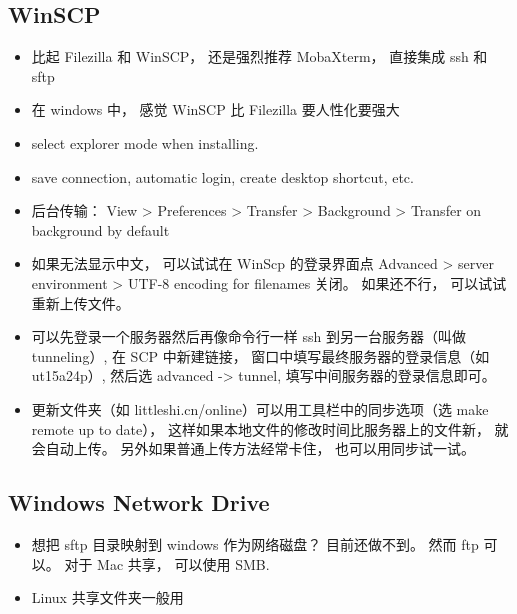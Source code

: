 \subsection{WinSCP}
\begin{itemize}
\item 比起 Filezilla 和 WinSCP， 还是强烈推荐 MobaXterm， 直接集成 ssh 和 sftp
\item 在 windows 中， 感觉 WinSCP 比 Filezilla 要人性化要强大
\item select explorer mode when installing.
\item save connection, automatic login, create desktop shortcut, etc.
\item 后台传输： View > Preferences > Transfer > Background > Transfer on background by default
\item 如果无法显示中文， 可以试试在 WinScp 的登录界面点 Advanced > server environment > UTF-8 encoding for filenames 关闭。 如果还不行， 可以试试重新上传文件。
\item 可以先登录一个服务器然后再像命令行一样 ssh 到另一台服务器（叫做 tunneling）, 在 SCP 中新建链接， 窗口中填写最终服务器的登录信息（如 ut15a24p）, 然后选 advanced -> tunnel, 填写中间服务器的登录信息即可。
\item 更新文件夹（如 littleshi.cn/online）可以用工具栏中的同步选项（选 make remote up to date）， 这样如果本地文件的修改时间比服务器上的文件新， 就会自动上传。 另外如果普通上传方法经常卡住， 也可以用同步试一试。
\end{itemize}

\subsection{Windows Network Drive}
\begin{itemize}
\item 想把 sftp 目录映射到 windows 作为网络磁盘？ 目前还做不到。 然而 ftp 可以。 对于 Mac 共享， 可以使用 SMB.
\item Linux 共享文件夹一般用 
\end{itemize}
